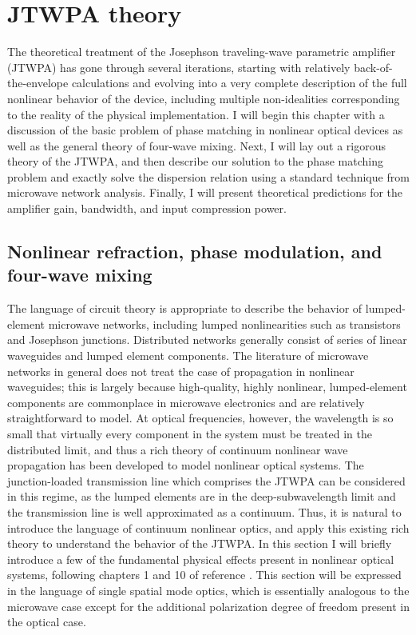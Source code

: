 
\chapter{JTWPA theory}
\label{c:twpa_theory}

The theoretical treatment of the Josephson traveling-wave parametric amplifier (JTWPA) has gone through several iterations, starting with relatively back-of-the-envelope calculations and evolving into a very complete description of the full nonlinear behavior of the device, including multiple non-idealities corresponding to the reality of the physical implementation.  I will begin this chapter with a discussion of the basic problem of phase matching in nonlinear optical devices as well as the general theory of four-wave mixing.  Next, I will lay out a rigorous theory of the JTWPA, and then describe our solution to the phase matching problem and exactly solve the dispersion relation using a standard technique from microwave network analysis.  Finally, I will present theoretical predictions for the amplifier gain, bandwidth, and input compression power.

\section{Nonlinear refraction, phase modulation, and four-wave mixing}

The language of circuit theory is appropriate to describe the behavior of lumped-element microwave networks, including lumped nonlinearities such as transistors and Josephson junctions.  Distributed networks generally consist of series of linear waveguides and lumped element components.  The literature of microwave networks in general does not treat the case of propagation in nonlinear waveguides; this is largely because high-quality, highly nonlinear, lumped-element components are commonplace in microwave electronics and are relatively straightforward to model.  At optical frequencies, however, the wavelength is so small that virtually every component in the system must be treated in the distributed limit, and thus a rich theory of continuum nonlinear wave propagation has been developed to model nonlinear optical systems.  The junction-loaded transmission line which comprises the JTWPA can be considered in this regime, as the lumped elements are in the deep-subwavelength limit and the transmission line is well approximated as a continuum.  Thus, it is natural to introduce the language of continuum nonlinear optics, and apply this existing rich theory to understand the behavior of the JTWPA.  In this section I will briefly introduce a few of the fundamental physical effects present in nonlinear optical systems, following chapters 1 and 10 of reference \cite{Agrawal2012}.  This section will be expressed in the language of single spatial mode optics, which is essentially analogous to the microwave case except for the additional polarization degree of freedom present in the optical case.


